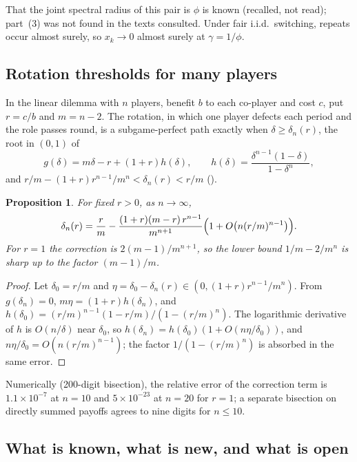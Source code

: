 \documentclass[11pt]{amsart}
\newtheorem{proposition}[theorem]{Proposition}
\theoremstyle{remark}
\begin{document}
That the joint spectral radius of this pair is $\phi$ is known (recalled, not read); part~(3) was not
found in the texts consulted. Under fair i.i.d.\ switching, repeats occur almost surely, so
$x_k\to0$ almost surely at $\gamma=1/\phi$.

\subsection{Rotation thresholds for many players}\label{ti:sec:rotation}

In the linear dilemma with $n$ players, benefit $b$ to each co-player and cost $c$, put $r=c/b$ and
$m=n-2$. The rotation, in which one player defects each period and the role passes round, is a
subgame-perfect path exactly when $\delta\ge\delta_n(r)$, the root in $(0,1)$ of
\[
  g(\delta)=m\delta-r+(1+r)h(\delta),\qquad h(\delta)=\frac{\delta^{n-1}(1-\delta)}{1-\delta^n},
\]
and $r/m-(1+r)r^{n-1}/m^n<\delta_n(r)<r/m$ (\cite[Propositions~2 and~7]{v1}).

\begin{proposition}\label{ti:prop:R7}
For fixed $r>0$, as $n\to\infty$,
\[
  \delta_n(r)=\frac rm-\frac{(1+r)(m-r)\,r^{n-1}}{m^{n+1}}\Bigl(1+O\bigl(n(r/m)^{n-1}\bigr)\Bigr).
\]
For $r=1$ the correction is $2(m-1)/m^{n+1}$, so the lower bound $1/m-2/m^n$ is sharp up to the
factor $(m-1)/m$.
\end{proposition}

\begin{proof}
Let $\delta_0=r/m$ and $\eta=\delta_0-\delta_n(r)\in(0,(1+r)r^{n-1}/m^n)$. From $g(\delta_n)=0$,
$m\eta=(1+r)h(\delta_n)$, and $h(\delta_0)=(r/m)^{n-1}(1-r/m)/(1-(r/m)^n)$. The logarithmic derivative
of $h$ is $O(n/\delta)$ near $\delta_0$, so $h(\delta_n)=h(\delta_0)(1+O(n\eta/\delta_0))$, and
$n\eta/\delta_0=O(n(r/m)^{n-1})$; the factor $1/(1-(r/m)^n)$ is absorbed in the same error.
\end{proof}

Numerically (200-digit bisection), the relative error of the correction term is $1.1\times10^{-7}$ at
$n=10$ and $5\times10^{-23}$ at $n=20$ for $r=1$; a separate bisection on directly summed payoffs
agrees to nine digits for $n\le10$.

\subsection{What is known, what is new, and what is open}\label{ti:sec:status}
\end{document}
